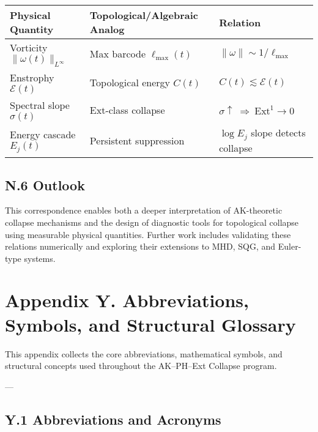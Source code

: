 \documentclass[11pt]{article}
\theoremstyle{definition}
\begin{document}
\begin{center}
\renewcommand{\arraystretch}{1.3}
\begin{tabular}{|l|l|l|}
\hline
\textbf{Physical Quantity} & \textbf{Topological/Algebraic Analog} & \textbf{Relation} \\
\hline
Vorticity \( \|\omega(t)\|_{L^\infty} \) & Max barcode \( \ell_{\max}(t) \) & \( \|\omega\| \sim 1/\ell_{\max} \) \\
Enstrophy \( \mathcal{E}(t) \) & Topological energy \( C(t) \) & \( C(t) \lesssim \mathcal{E}(t) \) \\
Spectral slope \( \sigma(t) \) & Ext-class collapse & \( \sigma \uparrow \ \Rightarrow \ \mathrm{Ext}^1 \to 0 \) \\
Energy cascade \( E_j(t) \) & Persistent suppression & \( \log E_j \) slope detects collapse \\
\hline
\end{tabular}
\end{center}

\subsection*{N.6 Outlook}

This correspondence enables both a deeper interpretation of AK-theoretic collapse mechanisms and the design of diagnostic tools for topological collapse using measurable physical quantities.  
Further work includes validating these relations numerically and exploring their extensions to MHD, SQG, and Euler-type systems.


\section*{Appendix Y. Abbreviations, Symbols, and Structural Glossary}

This appendix collects the core abbreviations, mathematical symbols, and structural concepts used throughout the AK–PH–Ext Collapse program.

---

\subsection*{Y.1 Abbreviations and Acronyms}
\end{document}
